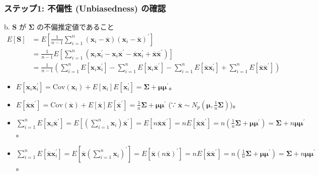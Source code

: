 \documentclass[aspectratio=169]{beamer}
\begin{document}
\begin{frame}
\frametitle{ステップ1: 不偏性 (Unbiasedness) の確認}
\begin{block}{b. $\bm{S}$ が $\bm{\Sigma}$ の不偏推定値であること}
\begin{align*}
E[\bm{S}] &= E\left[\frac{1}{n-1}\sum_{i=1}^{n}(\bm{x}_i-\overline{\bm{x}})(\bm{x}_i-\overline{\bm{x}})^{\prime}\right] \\
&= \frac{1}{n-1}E\left[\sum_{i=1}^{n}(\bm{x}_i\bm{x}_i^{\prime}-\bm{x}_i\overline{\bm{x}}^{\prime}-\overline{\bm{x}}\bm{x}_i^{\prime}+\overline{\bm{x}}\overline{\bm{x}}^{\prime})\right] \\
&= \frac{1}{n-1}\left(\sum_{i=1}^{n}E[\bm{x}_i\bm{x}_i^{\prime}]-\sum_{i=1}^{n}E[\bm{x}_i\overline{\bm{x}}^{\prime}]-\sum_{i=1}^{n}E[\overline{\bm{x}}\bm{x}_i^{\prime}]+\sum_{i=1}^{n}E[\overline{\bm{x}}\overline{\bm{x}}^{\prime}]\right)
\end{align*}
\begin{itemize}
    \item $E[\bm{x}_i\bm{x}_i^{\prime}]=\text{Cov}(\bm{x}_i)+E[\bm{x}_i]E[\bm{x}_i^{\prime}]=\bm{\Sigma}+\bm{\mu}\bm{\mu}^{\prime}$。
    \item $E[\overline{\bm{x}}\overline{\bm{x}}^{\prime}]=\text{Cov}(\overline{\bm{x}})+E[\overline{\bm{x}}]E[\overline{\bm{x}}^{\prime}]=\frac{1}{n}\bm{\Sigma}+\bm{\mu}\bm{\mu}^{\prime}$ (∵ $\overline{\bm{x}}\sim N_p(\bm{\mu},\frac{1}{n}\bm{\Sigma})$)。
    \item $\sum_{i=1}^{n}E[\bm{x}_i\overline{\bm{x}}^{\prime}]=E[(\sum_{i=1}^{n}\bm{x}_i)\overline{\bm{x}}^{\prime}]=E[n\overline{\bm{x}}\overline{\bm{x}}^{\prime}]=nE[\overline{\bm{x}}\overline{\bm{x}}^{\prime}]=n(\frac{1}{n}\bm{\Sigma}+\bm{\mu}\bm{\mu}^{\prime})=\bm{\Sigma}+n\bm{\mu}\bm{\mu}^{\prime}$。
    \item $\sum_{i=1}^{n}E[\overline{\bm{x}}\bm{x}_i^{\prime}]=E[\overline{\bm{x}}(\sum_{i=1}^{n}\bm{x}_i)^{\prime}]=E[\overline{\bm{x}}(n\overline{\bm{x}})^{\prime}]=nE[\overline{\bm{x}}\overline{\bm{x}}^{\prime}]=n(\frac{1}{n}\bm{\Sigma}+\bm{\mu}\bm{\mu}^{\prime})=\bm{\Sigma}+n\bm{\mu}\bm{\mu}^{\prime}$。
\end{itemize}
\end{block}
\end{frame}
\end{document}
